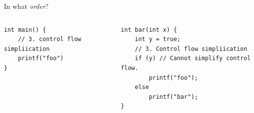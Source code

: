 \documentclass[8pt]{beamer}
\begin{document}
\begin{frame}[fragile]{In what \emph{order}?}


\pause
\begin{columns}
\begin{column}{.48\textwidth}
\begin{verbatim}
int main() {
    // 3. control flow simpliication
    printf("foo")
}
\end{verbatim}
\end{column}
\begin{column}{.48\textwidth}
\begin{verbatim}
int bar(int x) {
    int y = true;
    // 3. Control flow simpliication
    if (y) // Cannot simplify control flow. 
        printf("foo");
    else
        printf("bar");
}
\end{verbatim}
\end{column}
\end{columns}
\end{frame}
\end{document}
